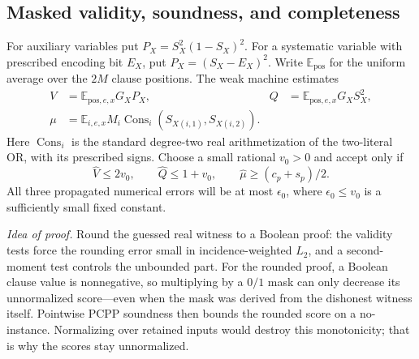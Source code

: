 \documentclass[11pt,letterpaper]{article}
\theoremstyle{definition}
\theoremstyle{remark}
\begin{document}
\subsection{Masked validity, soundness, and completeness}
\label{tr:verification}

For auxiliary variables put $P_X=S_X^2(1-S_X)^2$.
For a systematic variable with prescribed encoding bit $E_X$, put
$P_X=(S_X-E_X)^2$. Write $\mathbb E_{\mathrm{pos}}$ for the uniform
average over the $2M$ clause positions. The weak machine estimates
\begin{align}
 V&=\mathbb E_{\mathrm{pos},e,x}G_XP_X,&
 Q&=\mathbb E_{\mathrm{pos},e,x}G_XS_X^2,\\
 \mu&=\mathbb E_{i,e,x}M_i
       \operatorname{Cons}_i(S_{X(i,1)},S_{X(i,2)}).
 \label{tr:tests}
\end{align}
Here $\operatorname{Cons}_i$ is the standard degree-two real
arithmetization of the two-literal OR, with its prescribed signs.
Choose a small rational $v_0>0$ and accept only if
\begin{equation}
 \widehat V\le2v_0,\qquad \widehat Q\le1+v_0,
 \qquad \widehat\mu\ge(c_p+s_p)/2.
 \label{tr:thresholds}
\end{equation}
All three propagated numerical errors will be at most $\epsilon_0$,
where $\epsilon_0\le v_0$ is a sufficiently small fixed constant.

\emph{Idea of proof.} Round the guessed real witness to a Boolean
proof: the validity tests force the rounding error small in
incidence-weighted $L_2$, and a second-moment test controls the
unbounded part. For the rounded proof, a Boolean clause value is
nonnegative, so multiplying by a $0/1$ mask can only decrease its
unnormalized score---even when the mask was derived from the
dishonest witness itself. Pointwise PCPP soundness then bounds the
rounded score on a no-instance. Normalizing over retained inputs
would destroy this monotonicity; that is why the scores stay
unnormalized.
\end{document}
